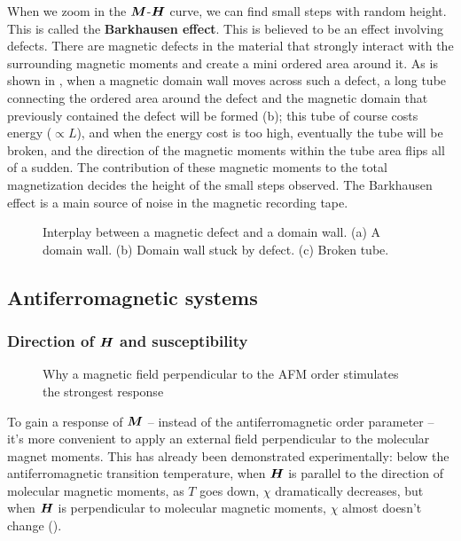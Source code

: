 \documentclass[hyperref, a4paper]{article}
\newcommand*{\concept}[1]{{\textbf{#1}}}
\begin{document}
When we zoom in the $\vb*{M}$-$\vb*{H}$ curve, 
we can find small steps with random height.
This is called the \concept{Barkhausen effect}.
This is believed to be an effect involving defects.
There are magnetic defects in the material that strongly interact with the surrounding magnetic moments 
and create a mini ordered area around it. 
As is shown in , 
when a magnetic domain wall moves across such a defect, 
a long tube connecting the ordered area around the defect 
and the magnetic domain that previously contained the defect will be formed (b);
this tube of course costs energy ($\propto L$), 
and when the energy cost is too high, 
eventually the tube will be broken, 
and the direction of the magnetic moments within the tube area 
flips all of a sudden. 
The contribution of these magnetic moments to the total magnetization 
decides the height of the small steps observed.
The Barkhausen effect is a main source of noise in the magnetic recording tape.

\begin{figure}
    \centering
    
    \caption{Interplay between a magnetic defect and a domain wall. 
    (a) A domain wall.
    (b) Domain wall stuck by defect.
    (c) Broken tube.}
    \label{fig:magnetic-defect-domain-wall-interplay}
\end{figure}

\subsection{Antiferromagnetic systems}

\subsubsection{Direction of $\vb*{H}$ and susceptibility}

\begin{figure}
    \centering
    
    \caption{Why a magnetic field perpendicular to the AFM order stimulates the strongest response}
    \label{fig:afm-response}
\end{figure}

To gain a response of $\vb*{M}$ -- instead of the antiferromagnetic order parameter -- 
it's more convenient to apply an external field 
perpendicular to the molecular magnet moments. 
This has already been demonstrated experimentally:
below the antiferromagnetic transition temperature,
when $\vb*{H}$ is parallel to the direction of molecular magnetic moments,
as $T$ goes down, $\chi$ dramatically decreases, 
but when $\vb*{H}$ is perpendicular to molecular magnetic moments, 
$\chi$ almost doesn't change
(). 
\end{document}
